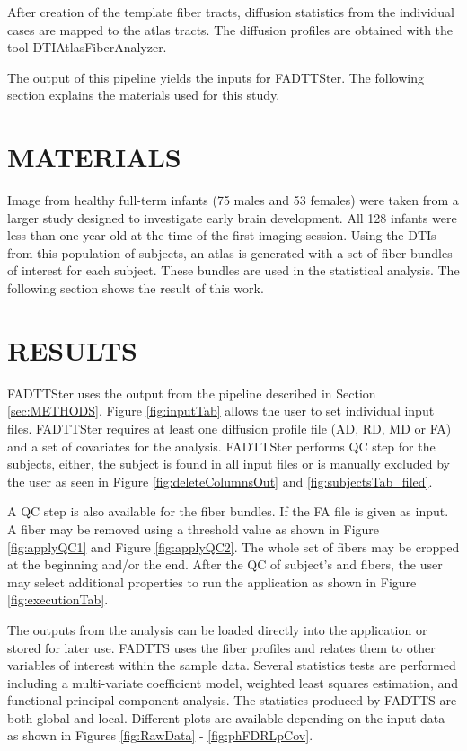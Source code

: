 \documentclass[]{spie}  %
\begin{document}
After creation of the template fiber tracts, diffusion statistics from the individual cases are mapped to the atlas tracts.
The diffusion profiles are obtained with the tool DTIAtlasFiberAnalyzer. 

The output of this pipeline yields the inputs for FADTTSter. The following section explains the materials used for this study. 

\section{MATERIALS}

Image from healthy full-term infants (75 males and 53 females) were taken from a
larger study designed to investigate early brain development. All 128 infants were less than one year old at the time of the first
imaging session. 
Using the DTIs from this population of subjects, an atlas is generated with a set of fiber bundles of interest for each subject. 
These bundles are used in the statistical analysis. The following section shows the result of this work. 

\section{RESULTS}

FADTTSter uses the output from the pipeline described in Section \ref{sec:METHODS}. 
Figure \ref{fig:inputTab} allows the user to set individual input files. 
FADTTSter requires at least one diffusion profile file (AD, RD, MD or FA) and a set of covariates for the analysis.
FADTTSter performs QC step for the subjects, either, the subject is found in all input files or is manually excluded by the user 
as seen in Figure \ref{fig:deleteColumnsOut} and \ref{fig:subjectsTab_filed}.

A QC step is also available for the fiber bundles. If the FA file is given as input. A fiber may be removed using a threshold value as shown in
Figure \ref{fig:applyQC1} and Figure \ref{fig:applyQC2}.
The whole set of fibers may be cropped at the beginning and/or the end. 
After the QC of subject's and fibers, the user may select additional properties to 
run the application as shown in Figure \ref{fig:executionTab}.

The outputs from the analysis can be loaded directly into the application or stored for later use.
FADTTS uses the fiber profiles and relates them to other variables of interest within the sample data. Several statistics tests are performed including a multi-variate coefficient model, weighted least squares estimation, and functional principal component analysis. The statistics produced by FADTTS are both global and local. 
Different plots are available depending on the input data as shown in 
Figures \ref{fig:RawData} - \ref{fig:phFDRLpCov}.
\end{document}
